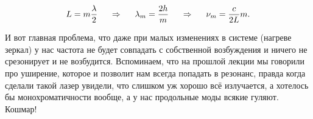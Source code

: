 \begin{equation*}
	L = m \frac{\lambda}{2}
	\hspace{0.5 cm}
	\Rightarrow
	\hspace{0.5 cm}
	\lambda_m = \frac{2 h}{m}
	\hspace{0.5 cm}
	\Rightarrow
	\hspace{0.5 cm}
	\nu_m = \frac{c}{2 L} m.
\end{equation*}

И вот главная проблема, что даже при малых изменениях в системе (нагреве зеркал) у нас частота не будет совпадать с собственной возбуждения и ничего не срезонирует и не возбудится. 
Вспоминаем, что на прошлой лекции мы говорили про уширение, которое и позволит нам всегда попадать в резонанс, правда когда сделали такой лазер увидели, что слишком уж хорошо всё излучается, а хотелось бы монохроматичности вообще, а у нас продольные моды всякие гуляют. Кошмар!